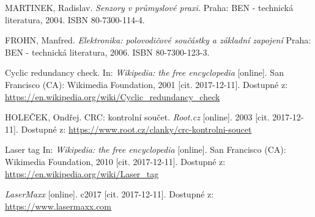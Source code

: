 \begin{literatura}{99}

    MARTINEK, Radislav.
    \emph{Senzory v průmyslové praxi.}
    Praha: BEN - technická literatura, 2004. ISBN 80-7300-114-4.

    FROHN, Manfred.
    \emph{Elektronika: polovodičové součástky a základní zapojení}
    Praha: BEN - technická literatura, 2006. ISBN 80-7300-123-3.

    Cyclic redundancy check.
    In: \emph{Wikipedia: the free encyclopedia} [online].
    San Francisco (CA): Wikimedia Foundation, 2001 [cit. 2017-12-11].
    Dostupné z: \url{https://en.wikipedia.org/wiki/Cyclic_redundancy_check}

    HOLEČEK, Ondřej.
    CRC: kontrolní součet.
    \emph{Root.cz} [online].
    2003 [cit. 2017-12-11].
    Dostupné z: \url{https://www.root.cz/clanky/crc-kontrolni-soucet}

    Laser tag
    In: \emph{Wikipedia: the free encyclopedia} [online].
    San Francisco (CA): Wikimedia Foundation, 2010 [cit. 2017-12-11].
    Dostupné z: \url{https://en.wikipedia.org/wiki/Laser_tag}

    \emph{LaserMaxx} [online].
    c2017 [cit. 2017-12-11].
    Dostupné z: \url{https://www.lasermaxx.com}

\end{literatura}
